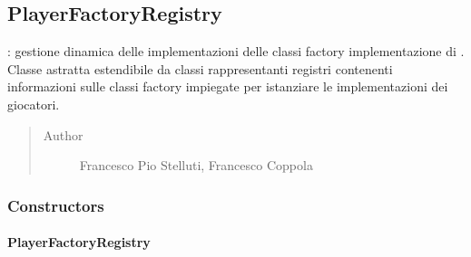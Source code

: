 \documentclass[letterpaper,10pt,italian,openany,oneside]{sphinxmanual}
\begin{document}
\subsection{PlayerFactoryRegistry}
\label{\detokenize{test/it/unicam/cs/pa/mastermind/factories/PlayerFactoryRegistry:playerfactoryregistry}}\label{\detokenize{test/it/unicam/cs/pa/mastermind/factories/PlayerFactoryRegistry::doc}}

\begin{fulllineitems}
\label{\detokenize{test/it/unicam/cs/pa/mastermind/factories/PlayerFactoryRegistry:it.unicam.cs.pa.mastermind.factories.PlayerFactoryRegistry}}
: gestione dinamica delle implementazioni delle classi factory implementazione di . Classe astratta estendibile da classi rappresentanti registri contenenti informazioni sulle classi factory impiegate per istanziare le implementazioni dei giocatori.
\begin{quote}\begin{description}
\item[{Author}] \leavevmode
Francesco Pio Stelluti, Francesco Coppola

\end{description}\end{quote}

\end{fulllineitems}



\subsubsection{Constructors}
\label{\detokenize{test/it/unicam/cs/pa/mastermind/factories/PlayerFactoryRegistry:constructors}}

\paragraph{PlayerFactoryRegistry}
\label{\detokenize{test/it/unicam/cs/pa/mastermind/factories/PlayerFactoryRegistry:id1}}
\end{document}
